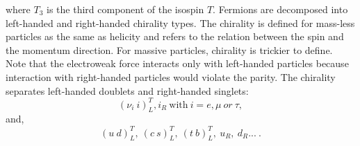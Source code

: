 where $T_3$ is the third component of the isospin $T$.
Fermions are decomposed into left-handed and right-handed chirality types. The chirality is defined for mass-less particles as the same as helicity and refers to the relation between the spin and the momentum direction. For massive particles, chirality is trickier to define. Note that the electroweak force interacts only with left-handed particles because interaction with right-handed particles would violate the parity. The chirality separates left-handed doublets and right-handed singlets:
\begin{equation}
    (\nu_i \ i)^T_L, i_R \ \text{with} \ i = e, \mu \ or \ \tau,
\end{equation}
and, 
\begin{equation}
    (u \ d)^T_L, \ (c \ s)^T_L, \ (t \ b)^T_L, \ u_R, \ d_R ... \ . 
\end{equation}

